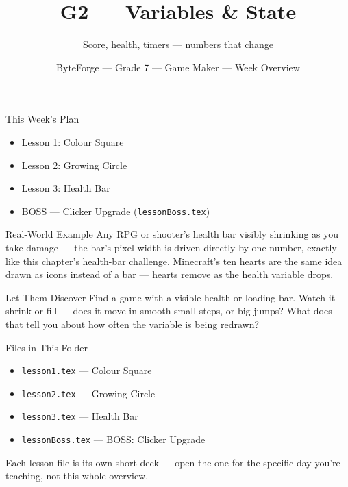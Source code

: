 \documentclass[aspectratio=169]{beamer}
\title{G2 — Variables \& State}
\subtitle{Score, health, timers — numbers that change}
\author{ByteForge --- Grade 7 --- Game Maker --- Week Overview}
\date{}
\begin{document}
\begin{frame}
    \titlepage
\end{frame}

\begin{frame}{This Week's Plan}
    \begin{itemize}
        \item Lesson 1: Colour Square
        \item Lesson 2: Growing Circle
        \item Lesson 3: Health Bar
        \item[$\bigstar$] BOSS --- Clicker Upgrade (\texttt{lessonBoss.tex})
    \end{itemize}
\end{frame}

\begin{frame}{Real-World Example}
    \Large
    Any RPG or shooter's health bar visibly shrinking as you take damage — the bar's pixel width is driven directly by one number, exactly like this chapter's health-bar challenge. Minecraft's ten hearts are the same idea drawn as icons instead of a bar — hearts remove as the health variable drops.
\end{frame}


\begin{frame}{Let Them Discover}
    \Large
    Find a game with a visible health or loading bar. Watch it shrink or fill — does it move in smooth small steps, or big jumps? What does that tell you about how often the variable is being redrawn?
\end{frame}

\begin{frame}{Files in This Folder}
    \small
    \begin{itemize}
        \item \texttt{lesson1.tex} --- Colour Square
        \item \texttt{lesson2.tex} --- Growing Circle
        \item \texttt{lesson3.tex} --- Health Bar
        \item \texttt{lessonBoss.tex} --- BOSS: Clicker Upgrade
    \end{itemize}
    \vspace{0.5em}
    \normalsize Each lesson file is its own short deck --- open the one for
    the specific day you're teaching, not this whole overview.
\end{frame}
\end{document}
